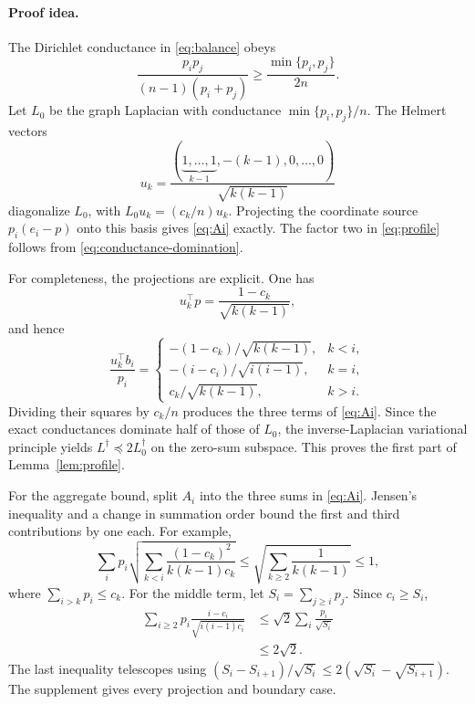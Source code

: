 \documentclass[twoside]{article}
\begin{document}
\paragraph{Proof idea.}
The Dirichlet conductance in \eqref{eq:balance} obeys
\begin{equation}
 \frac{p_ip_j}{(n-1)(p_i+p_j)}
 \ge\frac{\min\{p_i,p_j\}}{2n}.
 \label{eq:conductance-domination}
\end{equation}
Let $L_0$ be the graph Laplacian with conductance $\min\{p_i,p_j\}/n$. The Helmert vectors
\begin{equation}
 u_k=\frac{(\underbrace{1,\ldots,1}_{k-1},-(k-1),0,\ldots,0)}
 {\sqrt{k(k-1)}}
 \label{eq:helmert}
\end{equation}
diagonalize $L_0$, with $L_0u_k=(c_k/n)u_k$. Projecting the coordinate source $p_i(e_i-p)$ onto this basis gives \eqref{eq:Ai} exactly. The factor two in \eqref{eq:profile} follows from \eqref{eq:conductance-domination}.

For completeness, the projections are explicit. One has \[ u_k^\top p=\frac{1-c_k}{\sqrt{k(k-1)}}, \] and hence
\begin{equation}
 \frac{u_k^\top b_i}{p_i}=
 \begin{cases}
 -(1-c_k)/\sqrt{k(k-1)},&k<i,\\
 -(i-c_i)/\sqrt{i(i-1)},&k=i,\\
 c_k/\sqrt{k(k-1)},&k>i.
 \end{cases}
 \label{eq:projections}
\end{equation}
Dividing their squares by $c_k/n$ produces the three terms of \eqref{eq:Ai}. Since the exact conductances dominate half of those of $L_0$, the inverse-Laplacian variational principle yields $L^\dagger\preceq2L_0^\dagger$ on the zero-sum subspace. This proves the first part of Lemma~\ref{lem:profile}.

For the aggregate bound, split $A_i$ into the three sums in \eqref{eq:Ai}. Jensen's inequality and a change in summation order bound the first and third contributions by one each. For example, \[ \sum_i p_i\sqrt{\sum_{k<i} \frac{(1-c_k)^2}{k(k-1)c_k}} \le\sqrt{\sum_{k\ge2}\frac1{k(k-1)}}\le1, \] where $\sum_{i>k}p_i\le c_k$. For the middle term, let $S_i=\sum_{j\ge i}p_j$. Since $c_i\ge S_i$,
\begin{align*}
 \sum_{i\ge2}p_i\frac{i-c_i}{\sqrt{i(i-1)c_i}}
 &\le\sqrt2\sum_i\frac{p_i}{\sqrt{S_i}}\\
 &\le2\sqrt2.
\end{align*}
The last inequality telescopes using $(S_i-S_{i+1})/\sqrt{S_i}\le2(\sqrt{S_i}-\sqrt{S_{i+1}})$. The supplement gives every projection and boundary case.
\end{document}
